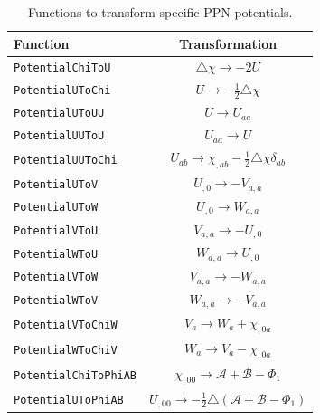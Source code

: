 \documentclass[notitlepage,a4paper,aps,prd,onecolumn,superscriptaddress,nofootinbib,groupedaddress,longbibliography]{revtex4-1}
\begin{document}
\begin{table}[htb]
\centering
\begin{tabular}{l|c}
Function & Transformation\\\hline
\lstinline/PotentialChiToU/ & $\triangle\chi \to -2U$\\
\lstinline/PotentialUToChi/ & $U \to -\frac{1}{2}\triangle\chi$\\
\lstinline/PotentialUToUU/ & $U \to U_{aa}$\\
\lstinline/PotentialUUToU/ & $U_{aa} \to U$\\
\lstinline/PotentialUUToChi/ & $U_{ab} \to \chi_{,ab} - \frac{1}{2}\triangle\chi\delta_{ab}$\\
\lstinline/PotentialUToV/ & $U_{,0} \to -V_{a,a}$\\
\lstinline/PotentialUToW/ & $U_{,0} \to W_{a,a}$\\
\lstinline/PotentialVToU/ & $V_{a,a} \to -U_{,0}$\\
\lstinline/PotentialWToU/ & $W_{a,a} \to U_{,0}$\\
\lstinline/PotentialVToW/ & $V_{a,a} \to -W_{a,a}$\\
\lstinline/PotentialWToV/ & $W_{a,a} \to -V_{a,a}$\\
\lstinline/PotentialVToChiW/ & $V_a \to W_a + \chi_{,0a}$\\
\lstinline/PotentialWToChiV/ & $W_a \to V_a - \chi_{,0a}$\\
\lstinline/PotentialChiToPhiAB/ & $\chi_{,00} \to \mathcal{A} + \mathcal{B} - \Phi_1$\\
\lstinline/PotentialUToPhiAB/ & $U_{,00} \to -\frac{1}{2}\triangle(\mathcal{A} + \mathcal{B} - \Phi_1)$
\end{tabular}
\caption{Functions to transform specific PPN potentials.}
\label{tab:pottrans}
\end{table}
\end{document}
